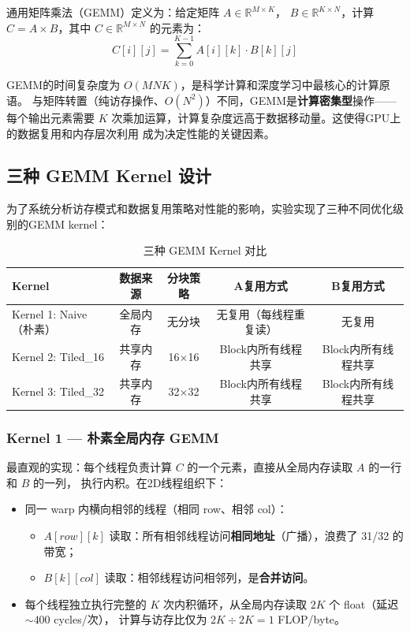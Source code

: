 \documentclass[UTF8,a4paper,12pt,fontset=none]{ctexart}
\begin{document}
通用矩阵乘法（GEMM）定义为：给定矩阵 $A \in \mathbb{R}^{M \times K}$，
$B \in \mathbb{R}^{K \times N}$，计算 $C = A \times B$，其中
$C \in \mathbb{R}^{M \times N}$ 的元素为：
\begin{equation}
  C[i][j] = \sum_{k=0}^{K-1} A[i][k] \cdot B[k][j]
\end{equation}

GEMM的时间复杂度为 $O(MNK)$，是科学计算和深度学习中最核心的计算原语。
与矩阵转置（纯访存操作、$O(N^2)$）不同，GEMM是\textbf{计算密集型}操作——每个输出元素需要
$K$ 次乘加运算，计算复杂度远高于数据移动量。这使得GPU上的数据复用和内存层次利用
成为决定性能的关键因素。

\subsection{三种 GEMM Kernel 设计}

为了系统分析访存模式和数据复用策略对性能的影响，实验实现了三种不同优化级别的GEMM kernel：

\begin{table}[H]
  \centering
  \caption{三种 GEMM Kernel 对比}
  \label{tab:kernels}
  \begin{tabular}{lcccc}
    \toprule
    Kernel & 数据来源 & 分块策略 & A复用方式 & B复用方式 \\
    \midrule
    Kernel 1: Naive（朴素） & 全局内存 & 无分块 & 无复用（每线程重复读） & 无复用 \\
    Kernel 2: Tiled\_16 & 共享内存 & 16×16 & Block内所有线程共享 & Block内所有线程共享 \\
    Kernel 3: Tiled\_32 & 共享内存 & 32×32 & Block内所有线程共享 & Block内所有线程共享 \\
    \bottomrule
  \end{tabular}
\end{table}

\subsubsection{Kernel 1 — 朴素全局内存 GEMM}

最直观的实现：每个线程负责计算 $C$ 的一个元素，直接从全局内存读取 $A$ 的一行和 $B$ 的一列，
执行内积。在2D线程组织下：

\begin{itemize}
  \item 同一 warp 内横向相邻的线程（相同 row、相邻 col）：
        \begin{itemize}
          \item $A[row][k]$ 读取：所有相邻线程访问\textbf{相同地址}（广播），浪费了 31/32 的带宽；
          \item $B[k][col]$ 读取：相邻线程访问相邻列，是\textbf{合并访问}。
        \end{itemize}
  \item 每个线程独立执行完整的 $K$ 次内积循环，从全局内存读取 $2K$ 个 float（延迟 $\sim 400$ cycles/次），
        计算与访存比仅为 $2K \div 2K = 1$ FLOP/byte。
\end{itemize}
\end{document}
